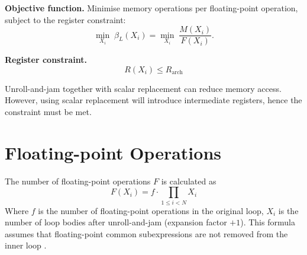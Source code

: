 \textbf{Objective function.} Minimise memory operations per floating-point
operation, subject to the register constraint:
\begin{equation}
  \min_{X_i}\;\beta_L(X_i)
  = \min_{X_i}\;\frac{M(X_i)}{F(X_i)}.
\end{equation}

\textbf{Register constraint.}
\begin{equation}
  R(X_{i}) \le R_{\text{arch}}
\end{equation}

Unroll-and-jam together with scalar replacement can reduce memory access.
However, using scalar replacement will introduce intermediate registers, hence
the constraint must be met.

%
%

\section{Floating-point Operations}
The number of floating-point operations $F$ is calculated as
\begin{equation}
  \label{eq:ck94-flop-count}
  F(X_{i}) = f \cdot \prod_{1 \le i < N} X_{i}
\end{equation}
Where $f$ is the number of floating-point operations in the original loop,
$X_{i}$ is the number of loop bodies after unroll-and-jam (expansion factor
$+1$). This formula assumes that floating-point common subexpressions are not
removed from the inner loop \cite{carrKennedy1994}. 


